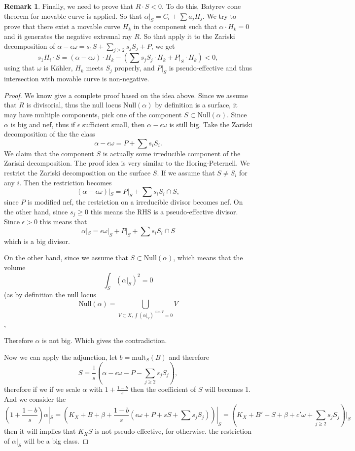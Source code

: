 \documentclass[11pt]{article}
\theoremstyle{definition}
\newtheorem{remark}[theorem]{Remark}
\begin{document}
\begin{remark}
		
		
		Finally, we need to prove that $R\cdot S<0$. To do this, Batyrev cone theorem for movable curve is applied. So that $\alpha|_S =  C_{\epsilon}+ \sum a_j H_j$. We try to prove that there exist a movable curve $H_k$ in the component such that $\alpha \cdot H_k = 0$ and it generates the negative extremal ray $R$. So that apply it to the Zariski decomposition of $\alpha -\epsilon \omega = s_1 S + \sum_{j\ge 2} s_j S_j + P $, we get $$s_1H_i \cdot S = (\alpha -\epsilon \omega)\cdot H_k - (\sum s_j S_j \cdot H_k + P|_S \cdot H_k)<0,$$ using that $\omega$ is K\"ahler, $H_k$ meets $S_j$ properly, and $P|_S$ is pseudo-effective and thus intersection with movable curve is non-negative. 
	\end{remark}
	\begin{proof}
		We know give a complete proof based on the idea above. Since we assume that $R$ is divisorial, thus the null locus $\text{Null}(\alpha)$ by definition is a surface, it may have multiple components, pick one of the component $S \subset \text{Null}(\alpha)$. Since $\alpha$ is big and nef, thus if $\epsilon$ sufficient small, then $\alpha - \epsilon \omega$ is still big. Take the Zariski decomposition of the the class $$\alpha - \epsilon \omega = P + \sum s_i S_i.$$We claim that the component $S$ is actually some irreducible component of the Zariski decomposition. The proof idea is very similar to the Horing-Peternell. We restrict the Zariski decomposition on the surface $S$. If we assume that $S \ne S_i$ for any $i$. Then the restriction becomes $$(\alpha- \epsilon \omega)|_S = P|_S + \sum s_i 
		S_i \cap S,$$since $P$ is modified nef, the restriction on a irreducible divisor becomes nef. On the other hand,  since $s_j \ge 0$ this means the RHS is a pseudo-effective divisor. Since $\epsilon >0$ this means that $$\alpha|_S = \epsilon \omega|_S + P|_S + \sum s_i S_i \cap S$$ which is a big divisor. 
		
		On the other hand, since we assume that $S \subset \text{Null}(\alpha)$, which means that the volume $$\int_S (\alpha|_S )^2 =0$$(as by definition the null locus $$\text{Null}(\alpha) = \bigcup _{V\subset X, \int (\alpha|_V)^{\dim V} = 0} V $$,
		
		Therefore $\alpha$ is not big. Which gives the contradiction. 
		
		
		Now we can apply the adjunction, let $b =\text{mult}_S(B)$ and therefore $$S = \frac{1}{s}(\alpha - \epsilon \omega 
		-P- \sum_{j\ge 2} s_j S_j),$$therefore if we if we scale $\alpha$ with $1 + \frac{1-b}{s}$ then the coefficient of $S$ will becomes 1. And we consider the $$(1+ \frac{1-b}{s} )\alpha|_S = (K_X+B +\beta + \frac{1-b}{s} (\epsilon \omega + P + sS + \sum s_j S_j))|_S = (K_X + B' + S + \beta + c' \omega + \sum_{j\ge 2} s_j S_j)|_S  $$ then it will implies that $K_XS$ is not pseudo-effective, for otherwise. the restriction of $\alpha|_S$ will be a big class. 
		

\end{proof}
\end{document}
